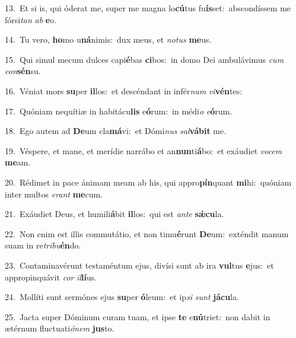 {\numbfont\textcolor{\numbcolor}{13.}}~Et si is, qui óderat me, super me magna lo\-\textbf{cú}\-tus fu\-\textbf{ís}\-set:~\star abscondíssem me fórsi\textit{tan} \textit{ab} \textbf{e}\-o.\par
{\numbfont\textcolor{\numbcolor}{14.}}~Tu vero, \textbf{ho}\-mo u\-\textbf{ná}\-nimis:~\star dux meus, et \textit{no}\-\textit{tus} \textbf{me}\-us.\par
{\numbfont\textcolor{\numbcolor}{15.}}~Qui simul mecum dulces capi\-\textbf{é}\-bas \textbf{ci}\-bos:~\star in domo Dei ambulávimus \textit{cum} \textit{con}\-\textbf{sén}su.\par
{\numbfont\textcolor{\numbcolor}{16.}}~Véniat mors \textbf{su}\-per \textbf{il}\-los:~\star et descéndant in infér\textit{num} \textit{vi}\-\textbf{vén}tes:\par
{\numbfont\textcolor{\numbcolor}{17.}}~Quóniam nequítiæ in habitácu\textbf{lis} e\-\textbf{ó}\-rum:~\star in médi\textit{o} \textit{e}\-\textbf{ó}rum.\par
{\numbfont\textcolor{\numbcolor}{18.}}~Ego autem ad \textbf{De}\-um cla\-\textbf{má}\-vi:~\star et Dómi\textit{nus} \textit{sal}\-\textbf{vá}\textbf{bit} me.\par
{\numbfont\textcolor{\numbcolor}{19.}}~Véspere, et mane, et merídie narrábo et an\-\textbf{nun}\-ti\-\textbf{á}\-bo:~\star et exáudiet \textit{vo}\-\textit{cem} \textbf{me}\-am.\par
{\numbfont\textcolor{\numbcolor}{20.}}~Rédimet in pace ánimam meam ab his, qui appro\-\textbf{pín}\-quant \textbf{mi}\-hi:~\star quóniam inter multos \textit{e}\-\textit{rant} \textbf{me}\-cum.\par
{\numbfont\textcolor{\numbcolor}{21.}}~Exáudiet Deus, et humili\-\textbf{á}\-bit \textbf{il}\-los:~\star qui est \textit{an}\-\textit{te} \textbf{sǽ}\-\textbf{cu}la.\par
{\numbfont\textcolor{\numbcolor}{22.}}~Non enim est illis commutátio, et non timu\-\textbf{é}\-runt \textbf{De}\-um:~\star exténdit manum suam in re\-\textit{tri}\-\textit{bu}\textbf{én}do.\par
{\numbfont\textcolor{\numbcolor}{23.}}~Contaminavérunt testaméntum ejus, divísi sunt ab ira \textbf{vul}\-tus \textbf{e}\-jus:~\star et appropinquávit \textit{cor} \textit{il}\-\textbf{lí}us.\par
{\numbfont\textcolor{\numbcolor}{24.}}~Mollíti sunt sermónes ejus \textbf{su}\-per \textbf{ó}\-leum:~\star et ip\textit{si} \textit{sunt} \textbf{já}\-\textbf{cu}la.\par
{\numbfont\textcolor{\numbcolor}{25.}}~Jacta super Dóminum curam tuam, et ipse \textbf{te} e\-\textbf{nú}\-triet:~\star non dabit in ætérnum fluctuati\-\textit{ó}\-\textit{nem} \textbf{jus}\-to.\par
